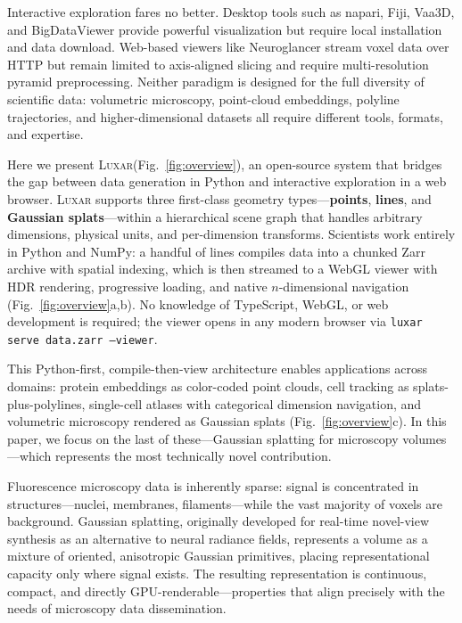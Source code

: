 \documentclass[10pt,twocolumn,letterpaper]{article}
\newcommand{\luxar}{\textsc{Luxar}\xspace}
\begin{document}
Interactive exploration fares no better.
Desktop tools such as napari\cite{sofroniew2022napari}, Fiji\cite{schindelin2012fiji}, Vaa3D\cite{peng2014vaa3d}, and BigDataViewer\cite{pietzsch2015bigdataviewer} provide powerful visualization but require local installation and data download.
Web-based viewers like Neuroglancer\cite{maitinshepard2021neuroglancer} stream voxel data over HTTP but remain limited to axis-aligned slicing and require multi-resolution pyramid preprocessing.
Neither paradigm is designed for the full diversity of scientific data: volumetric microscopy, point-cloud embeddings, polyline trajectories, and higher-dimensional datasets all require different tools, formats, and expertise.

Here we present \luxar (Fig.~\ref{fig:overview}), an open-source system that bridges the gap between data generation in Python and interactive exploration in a web browser.
\luxar supports three first-class geometry types---\textbf{points}, \textbf{lines}, and \textbf{Gaussian splats}---within a hierarchical scene graph that handles arbitrary dimensions, physical units, and per-dimension transforms.
Scientists work entirely in Python and NumPy: a handful of lines compiles data into a chunked Zarr\cite{miles2023zarr} archive with spatial indexing, which is then streamed to a WebGL viewer with HDR rendering, progressive loading, and native $n$-dimensional navigation (Fig.~\ref{fig:overview}a,b).
No knowledge of TypeScript, WebGL, or web development is required; the viewer opens in any modern browser via \texttt{luxar serve data.zarr --viewer}.

This Python-first, compile-then-view architecture enables applications across domains: protein embeddings as color-coded point clouds, cell tracking as splats-plus-polylines, single-cell atlases with categorical dimension navigation, and volumetric microscopy rendered as Gaussian splats (Fig.~\ref{fig:overview}c).
In this paper, we focus on the last of these---Gaussian splatting for microscopy volumes---which represents the most technically novel contribution.

Fluorescence microscopy data is inherently sparse: signal is concentrated in structures---nuclei, membranes, filaments---while the vast majority of voxels are background.
Gaussian splatting\cite{kerbl2023gaussian,yun2024gsplat}, originally developed for real-time novel-view synthesis as an alternative to neural radiance fields\cite{mildenhall2021nerf}, represents a volume as a mixture of oriented, anisotropic Gaussian primitives, placing representational capacity only where signal exists.
The resulting representation is continuous, compact, and directly GPU-renderable---properties that align precisely with the needs of microscopy data dissemination.
\end{document}
